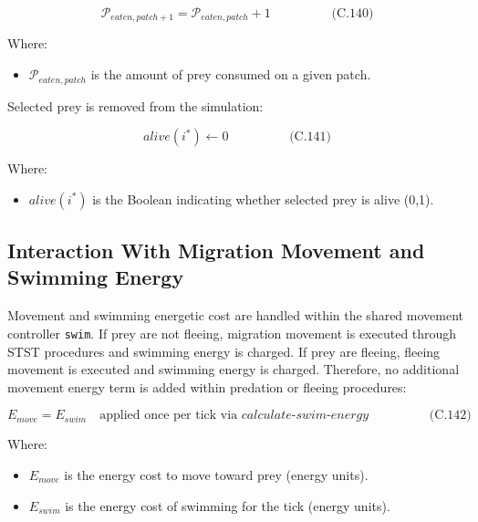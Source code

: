 \documentclass[
]{book}
\providecommand{\tightlist}{%
  \setlength{\itemsep}{0pt}\setlength{\parskip}{0pt}}
\begin{document}
\[
\begin{equation} \mathcal{P}_{eaten, patch+1} = \mathcal{P}_{eaten, patch} + 1  \hspace{2cm} \text{(C.140)} \end{equation}
\]

Where:

\begin{itemize}
\tightlist
\item
  \(\mathcal{P}_{eaten, patch}\) is the amount of prey consumed on a
  given patch.
\end{itemize}

Selected prey is removed from the simulation:

\[
\begin{equation} alive(i^*) \leftarrow 0  \hspace{2cm} \text{(C.141)} \end{equation}
\]

Where:

\begin{itemize}
\tightlist
\item
  \(alive(i^*)\) is the Boolean indicating whether selected prey is
  alive (0,1).
\end{itemize}

\subsection{Interaction With Migration Movement and Swimming Energy}\label{interaction-with-migration-movement-and-swimming-energy}

Movement and swimming energetic cost are handled within the shared
movement controller \texttt{swim}. If prey are not fleeing, migration movement
is executed through STST procedures and swimming energy is charged. If
prey are fleeing, fleeing movement is executed and swimming energy is
charged. Therefore, no additional movement energy term is added within
predation or fleeing procedures:

\[
\begin{equation} E_{move} = E_{swim} \quad \text{applied once per tick via } calculate\text{-}swim\text{-}energy  \hspace{2cm} \text{(C.142)} \end{equation}
\]

Where:

\begin{itemize}
\item
  \(E_{move}\) is the energy cost to move toward prey (energy units).
\item
  \(E_{swim}\) is the energy cost of swimming for the tick (energy
  units).
\end{itemize}
\end{document}
